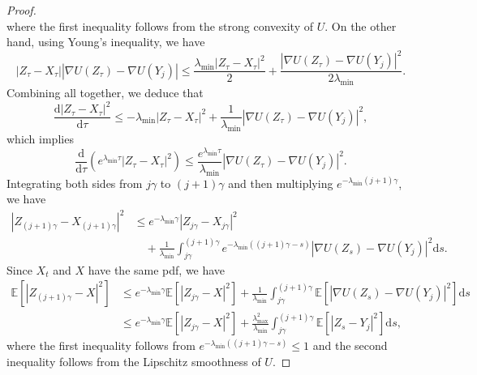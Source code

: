 \documentclass[11pt]{article}
\theoremstyle{plain}
\theoremstyle{definition}
\theoremstyle{remark}
\begin{document}
\begin{proof}
\begin{equation}
\end{equation}
where the first inequality follows from the strong convexity of $U$.
On the other hand, using Young's inequality, we have 
\[
|Z_{\tau} - X_{\tau}|  |  \nabla U(Z_{\tau}) - \nabla U (Y_j) | 
\leq \frac{\lambda_{\min}| Z_{\tau} - X_{\tau}|^2}{2}  + \frac{|   \nabla U(Z_{\tau}) - \nabla U (Y_j) |^2}{2  \lambda_{\min}}.
\]
Combining all together, we deduce that
\[
\frac{\mathrm{d} |Z_{\tau} - X_{\tau}|^2}{\mathrm{d}{\tau}} \leq - \lambda_{\min}| Z_{\tau} - X_{\tau}|^2 + \frac{1}{\lambda_{\min}} |   \nabla U(Z_{\tau}) - \nabla U (Y_j) |^2,
\]
which implies 
\[
\frac{\mathrm{d}}{\mathrm{d} {\tau}} (e^{\lambda_{\min}  {\tau}} | Z_{\tau} - X_{\tau} |^2) \leq 
\frac{e^{\lambda_{\min} {\tau}}}{\lambda_{\min}} |   \nabla U(Z_{\tau}) - \nabla U (Y_j) |^2.
\]
Integrating both sides from $j\gamma$ to $(j+1)\gamma$ and then multiplying $e^{-\lambda_{\min} (j+1) \gamma}$, we have
\begin{align*}
| Z_{(j+1)\gamma} - X_{(j+1)\gamma} |^2 &\leq 
e^{-\lambda_{\min}  \gamma} | Z_{j\gamma} - X_{j\gamma} |^2\\
&\quad+\frac{1}{\lambda_{\min}} \int_{j\gamma}^{(j+1) \gamma} 
e^{-\lambda_{\min}( (j+1)\gamma - s)} |   \nabla U(Z_s) - \nabla U (Y_j) |^2 \mathrm{d} s.
\end{align*}
Since $X_t$ and $X$ have the same pdf, 
we have
\begin{align}
\mathbb{E} [| Z_{(j+1)\gamma} - X |^2 ] &\leq 
e^{-\lambda_{\min} \gamma} \mathbb{E} [ | Z_{j\gamma} - X |^2]
+\frac{1}{\lambda_{\min}} \int_{j\gamma}^{(j+1) \gamma} 
 \mathbb{E} [ | \nabla U(Z_s) - \nabla U (Y_j) |^2 ]\mathrm{d} s \nonumber\\
 &\leq e^{-\lambda_{\min}  \gamma} \mathbb{E} [ | Z_{j\gamma} - X |^2]
+\frac{\lambda_{\max}^2}{\lambda_{\min} } \int_{j\gamma}^{(j+1) \gamma} 
\mathbb{E} [ | Z_s-Y_j|^2 ] \mathrm{d} s,\label{eq:naive_bd}
\end{align}
where the first inequality follows from $e^{-\lambda_{\min} ( (j+1)\gamma - s)}  \leq 1$ and the second inequality follows from the Lipschitz smoothness of $U$.


\end{proof}
\end{document}
